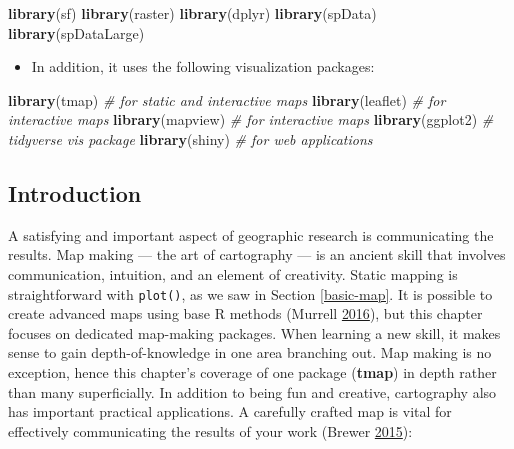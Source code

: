 \documentclass[]{krantz}
\newenvironment{Shaded}{\begin{snugshade}}{\end{snugshade}}
\newcommand{\CommentTok}[1]{\textcolor[rgb]{0.37,0.37,0.37}{\textit{#1}}}
\newcommand{\KeywordTok}[1]{\textcolor[rgb]{0.27,0.27,0.27}{\textbf{#1}}}
\newcommand{\NormalTok}[1]{#1}
\providecommand{\tightlist}{%
  \setlength{\itemsep}{0pt}\setlength{\parskip}{0pt}}
\begin{document}
\begin{Shaded}
\begin{Highlighting}[]
\KeywordTok{library}\NormalTok{(sf)}
\KeywordTok{library}\NormalTok{(raster)}
\KeywordTok{library}\NormalTok{(dplyr)}
\KeywordTok{library}\NormalTok{(spData)}
\KeywordTok{library}\NormalTok{(spDataLarge)}
\end{Highlighting}
\end{Shaded}

\begin{itemize}
\tightlist
\item
  In addition, it uses the following visualization packages:
\end{itemize}

\begin{Shaded}
\begin{Highlighting}[]
\KeywordTok{library}\NormalTok{(tmap)    }\CommentTok{# for static and interactive maps}
\KeywordTok{library}\NormalTok{(leaflet) }\CommentTok{# for interactive maps}
\KeywordTok{library}\NormalTok{(mapview) }\CommentTok{# for interactive maps}
\KeywordTok{library}\NormalTok{(ggplot2) }\CommentTok{# tidyverse vis package}
\KeywordTok{library}\NormalTok{(shiny)   }\CommentTok{# for web applications}
\end{Highlighting}
\end{Shaded}

\hypertarget{introduction-5}{%
\subsection{Introduction}\label{introduction-5}}

A satisfying and important aspect of geographic research is communicating the results.
Map making --- the art of cartography --- is an ancient skill that involves communication, intuition, and an element of creativity.
Static mapping is straightforward with \texttt{plot()}, as we saw in Section \ref{basic-map}.
It is possible to create advanced maps using base R methods (Murrell \protect\hyperlink{ref-murrell_r_2016}{2016}), but this chapter focuses on dedicated map-making packages.
When learning a new skill, it makes sense to gain depth-of-knowledge in one area branching out.
Map making is no exception, hence this chapter's coverage of one package (\textbf{tmap}) in depth rather than many superficially.
In addition to being fun and creative, cartography also has important practical applications.
A carefully crafted map is vital for effectively communicating the results of your work (Brewer \protect\hyperlink{ref-brewer_designing_2015}{2015}):
\end{document}
